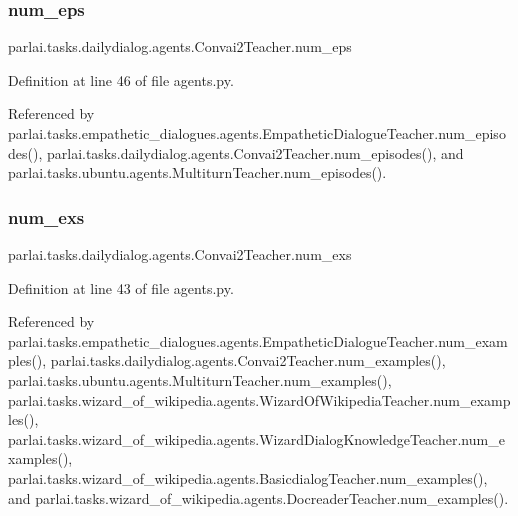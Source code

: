 \subsubsection{\texorpdfstring{num\+\_\+eps}{num\_eps}}
{\footnotesize\ttfamily parlai.\+tasks.\+dailydialog.\+agents.\+Convai2\+Teacher.\+num\+\_\+eps}



Definition at line 46 of file agents.\+py.



Referenced by parlai.\+tasks.\+empathetic\+\_\+dialogues.\+agents.\+Empathetic\+Dialogue\+Teacher.\+num\+\_\+episodes(), parlai.\+tasks.\+dailydialog.\+agents.\+Convai2\+Teacher.\+num\+\_\+episodes(), and parlai.\+tasks.\+ubuntu.\+agents.\+Multiturn\+Teacher.\+num\+\_\+episodes().

\mbox{\label{classparlai_1_1tasks_1_1dailydialog_1_1agents_1_1Convai2Teacher_a067edc53b57e9157e32e740952ad4d79}} 
\subsubsection{\texorpdfstring{num\+\_\+exs}{num\_exs}}
{\footnotesize\ttfamily parlai.\+tasks.\+dailydialog.\+agents.\+Convai2\+Teacher.\+num\+\_\+exs}



Definition at line 43 of file agents.\+py.



Referenced by parlai.\+tasks.\+empathetic\+\_\+dialogues.\+agents.\+Empathetic\+Dialogue\+Teacher.\+num\+\_\+examples(), parlai.\+tasks.\+dailydialog.\+agents.\+Convai2\+Teacher.\+num\+\_\+examples(), parlai.\+tasks.\+ubuntu.\+agents.\+Multiturn\+Teacher.\+num\+\_\+examples(), parlai.\+tasks.\+wizard\+\_\+of\+\_\+wikipedia.\+agents.\+Wizard\+Of\+Wikipedia\+Teacher.\+num\+\_\+examples(), parlai.\+tasks.\+wizard\+\_\+of\+\_\+wikipedia.\+agents.\+Wizard\+Dialog\+Knowledge\+Teacher.\+num\+\_\+examples(), parlai.\+tasks.\+wizard\+\_\+of\+\_\+wikipedia.\+agents.\+Basicdialog\+Teacher.\+num\+\_\+examples(), and parlai.\+tasks.\+wizard\+\_\+of\+\_\+wikipedia.\+agents.\+Docreader\+Teacher.\+num\+\_\+examples().

